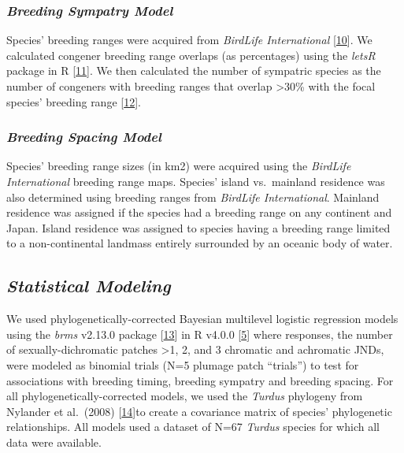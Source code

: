 \hypertarget{breeding-sympatry-model}{%
\subsubsection{\texorpdfstring{\emph{Breeding Sympatry
Model}}{Breeding Sympatry Model}}\label{breeding-sympatry-model}}

Species' breeding ranges were acquired from \emph{BirdLife
International}
{[}\protect\hyperlink{ref-birdlifeinternationalandhandbookofthebirdsoftheworldBirdSpeciesDistribution2018}{10}{]}⁠.
We calculated congener breeding range overlaps (as percentages) using
the \emph{letsR} package in R
{[}\protect\hyperlink{ref-vilelaLetsRNewPackage2015}{11}{]}⁠. We then
calculated the number of sympatric species as the number of congeners
with breeding ranges that overlap \textgreater30\% with the focal
species' breeding range
{[}\protect\hyperlink{ref-cooneySexualSelectionSpeciation2017}{12}{]}.

\hypertarget{breeding-spacing-model}{%
\subsubsection{\texorpdfstring{\emph{Breeding Spacing
Model}}{Breeding Spacing Model}}\label{breeding-spacing-model}}

Species' breeding range sizes (in km2) were acquired using the
\emph{BirdLife International} breeding range maps. Species' island
vs.~mainland residence was also determined using breeding ranges from
\emph{BirdLife International}. Mainland residence was assigned if the
species had a breeding range on any continent and Japan. Island
residence was assigned to species having a breeding range limited to a
non-continental landmass entirely surrounded by an oceanic body of
water.

\hypertarget{statistical-modeling}{%
\subsection{\texorpdfstring{\emph{Statistical
Modeling}}{Statistical Modeling}}\label{statistical-modeling}}

We used phylogenetically-corrected Bayesian multilevel logistic
regression models using the \emph{brms} v2.13.0 package
{[}\protect\hyperlink{ref-burknerBrmsPackageBayesian2017}{13}{]} in R
v4.0.0
{[}\protect\hyperlink{ref-rcoreteamLanguageEnvironmentStatistical2020}{5}{]}⁠
where responses, the number of sexually-dichromatic patches
\textgreater1, 2, and 3 chromatic and achromatic JNDs, were modeled as
binomial trials (N=5 plumage patch ``trials'') to test for associations
with breeding timing, breeding sympatry and breeding spacing. For all
phylogenetically-corrected models, we used the \emph{Turdus} phylogeny
from Nylander et al.~(2008)
{[}\protect\hyperlink{ref-nylanderAccountingPhylogeneticUncertainty2008}{14}{]}to
create a covariance matrix of species' phylogenetic relationships. All
models used a dataset of N=67 \emph{Turdus} species for which all data
were available.

